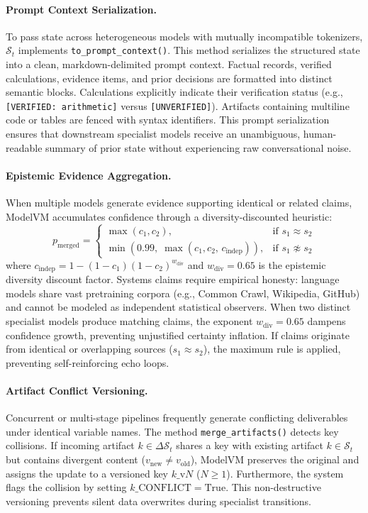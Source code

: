 \paragraph{Prompt Context Serialization.}
To pass state across heterogeneous models with mutually incompatible tokenizers, $\mathcal{S}_t$ implements \texttt{to\_prompt\_context()}. This method serializes the structured state into a clean, markdown-delimited prompt context. Factual records, verified calculations, evidence items, and prior decisions are formatted into distinct semantic blocks. Calculations explicitly indicate their verification status (e.g., \texttt{[VERIFIED: arithmetic]} versus \texttt{[UNVERIFIED]}). Artifacts containing multiline code or tables are fenced with syntax identifiers. This prompt serialization ensures that downstream specialist models receive an unambiguous, human-readable summary of prior state without experiencing raw conversational noise.

\paragraph{Epistemic Evidence Aggregation.}
When multiple models generate evidence supporting identical or related claims, ModelVM accumulates confidence through a diversity-discounted heuristic:
\begin{equation}
p_{\text{merged}} = \begin{cases}
\max(c_1, c_2), & \text{if } s_1 \approx s_2 \\[3pt]
\min\left(0.99, \;\max(c_1, c_2, \, c_{\text{indep}})\right), & \text{if } s_1 \not\approx s_2
\end{cases}
\label{eq:evidence_aggregation}
\end{equation}
where $c_{\text{indep}} = 1 - (1 - c_1)(1 - c_2)^{w_{\text{div}}}$ and $w_{\text{div}} = 0.65$ is the epistemic diversity discount factor. Systems claims require empirical honesty: language models share vast pretraining corpora (e.g., Common Crawl, Wikipedia, GitHub) and cannot be modeled as independent statistical observers. When two distinct specialist models produce matching claims, the exponent $w_{\text{div}} = 0.65$ dampens confidence growth, preventing unjustified certainty inflation. If claims originate from identical or overlapping sources ($s_1 \approx s_2$), the maximum rule is applied, preventing self-reinforcing echo loops.

\paragraph{Artifact Conflict Versioning.}
Concurrent or multi-stage pipelines frequently generate conflicting deliverables under identical variable names. The method \texttt{merge\_artifacts()} detects key collisions. If incoming artifact $k \in \Delta \mathcal{S}_t$ shares a key with existing artifact $k \in \mathcal{S}_t$ but contains divergent content ($v_{\text{new}} \neq v_{\text{old}}$), ModelVM preserves the original and assigns the update to a versioned key $k\text{\_v}N$ ($N \ge 1$). Furthermore, the system flags the collision by setting $k\text{\_CONFLICT} = \text{True}$. This non-destructive versioning prevents silent data overwrites during specialist transitions.

